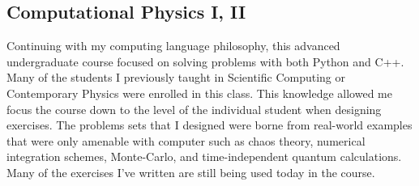 \documentclass[]{scrartcl}
\begin{document}
\begin{cleanCV}
\subsection{Computational Physics I, II}

Continuing with my computing language philosophy, this advanced undergraduate course focused on solving problems with both Python and C++.
Many of the students I previously taught in Scientific Computing or Contemporary Physics were enrolled in this class.
This knowledge allowed me focus the course down to the level of the individual student when designing exercises.
The problems sets that I designed were borne from real-world examples that were only amenable with computer such as chaos theory, numerical integration schemes, Monte-Carlo, and time-independent quantum calculations.
Many of the exercises I've written are still being used today in the course.

\end{cleanCV}
\end{document}
